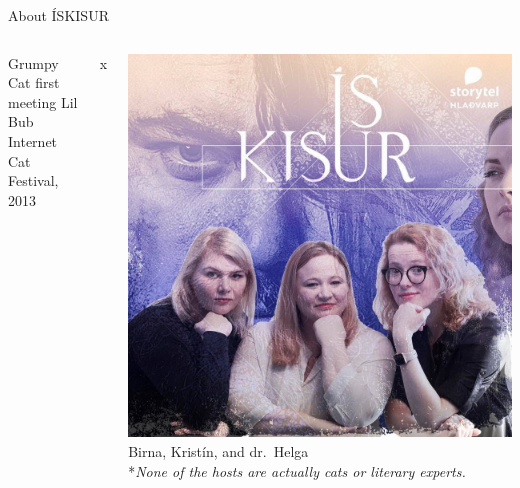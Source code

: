\begin{frame}{About ÍSKISUR}
\begin{columns}[T]
\begin{column}{0.55\textwidth}
            \scriptsize{Grumpy Cat first meeting Lil Bub\\Internet Cat Festival, 2013}
        \end{column}x
        \begin{column}{0.45\textwidth}
            \centering
            \includegraphics[width=\textwidth]{../figures/podcast_image.jpg}
            \vfill
            Birna, Kristín, and dr.~Helga\\
            \vspace{12pt}
            \footnotesize{*\textit{None of the hosts are actually cats or literary experts.}}
        \end{column}
    \end{columns}
\end{frame}

